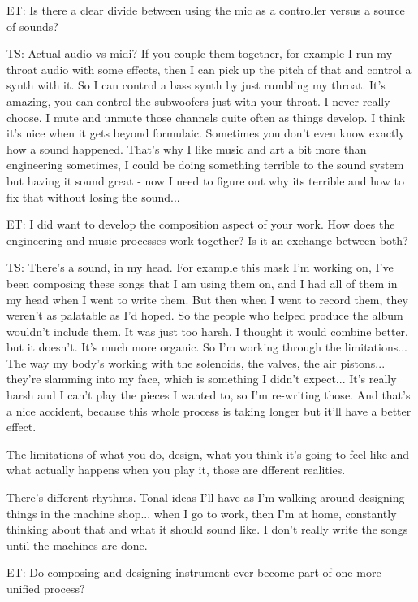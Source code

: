 ET: Is there a clear divide between using the mic as a controller versus a source of sounds? 

TS: Actual audio vs midi? If you couple them together, for example I run my throat audio with some effects, then I can pick up the pitch of that and control a synth with it. So I can control a bass synth by just rumbling my throat. It's amazing, you can control the subwoofers just with your throat. I never really choose. I mute and unmute those channels quite often as things develop. I think it's nice when it gets beyond formulaic. Sometimes you don't even know exactly how a sound happened. That's why I like music and art a bit more than engineering sometimes, I could be doing something terrible to the sound system but having it sound great - now I need to figure out why its terrible and how to fix that without losing the sound... 

ET: I did want to develop the composition aspect of your work. How does the engineering and music processes work together? Is it an exchange between both? 

TS: There's a sound, in my head. For example this mask I'm working on, I've been composing these songs that I am using them on, and I had all of them in my head when I went to write them. But then when I went to record them, they weren't as palatable as I'd hoped. So the people who helped produce the album wouldn't include them. It was just too harsh. I thought it would combine better, but it doesn't. It's much more organic. So I'm working through the limitations... The way my body's working with the solenoids, the valves, the air pistons... they're slamming into my face, which is something I didn't expect... It's really harsh and I can't play the pieces I wanted to, so I'm re-writing those. And that's a nice accident, because this whole process is taking longer but it'll have a better effect. 

The limitations of what you do, design, what you think it's going to feel like and what actually happens when you play it, those are dfferent realities. 

There's different rhythms. Tonal ideas I'll have as I'm walking around designing things in the machine shop... when I go to work, then I'm at home, constantly thinking about that and what it should sound like. I don't really write the songs until the machines are done. 

ET: Do composing and designing instrument ever become part of one more unified process? 

